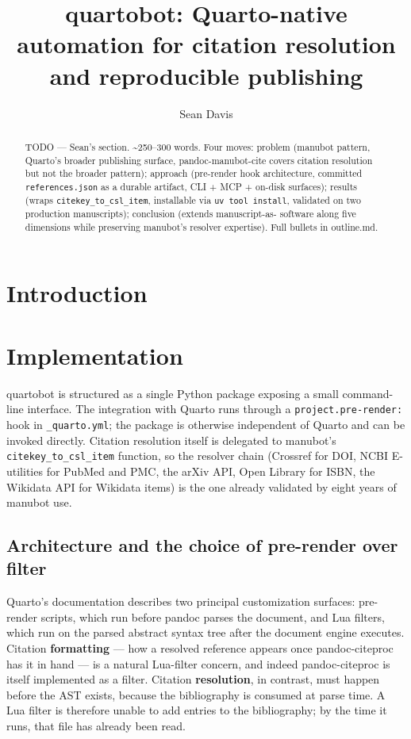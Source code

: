 \documentclass[
  letterpaper,
  DIV=11,
  numbers=noendperiod]{scrartcl}
\title{quartobot: Quarto-native automation for citation resolution and
reproducible publishing}
\author{Sean Davis}
\date{}
\begin{document}
\maketitle
\begin{abstract}
TODO --- Sean's section. \textasciitilde250--300 words. Four moves:
problem (manubot pattern, Quarto's broader publishing surface,
pandoc-manubot-cite covers citation resolution but not the broader
pattern); approach (pre-render hook architecture, committed
\texttt{references.json} as a durable artifact, CLI + MCP + on-disk
surfaces); results (wraps \texttt{citekey\_to\_csl\_item}, installable
via \texttt{uv\ tool\ install}, validated on two production
manuscripts); conclusion (extends manuscript-as- software along five
dimensions while preserving manubot's resolver expertise). Full bullets
in outline.md.
\end{abstract}


\section{Introduction}\label{introduction}

\section{Implementation}\label{implementation}

quartobot is structured as a single Python package exposing a small
command-line interface. The integration with Quarto runs through a
\texttt{project.pre-render:} hook in \texttt{\_quarto.yml}; the package
is otherwise independent of Quarto and can be invoked directly. Citation
resolution itself is delegated to manubot's
\texttt{citekey\_to\_csl\_item} function, so the resolver chain
(Crossref for DOI, NCBI E-utilities for PubMed and PMC, the arXiv API,
Open Library for ISBN, the Wikidata API for Wikidata items) is the one
already validated by eight years of manubot use.

\subsection{Architecture and the choice of pre-render over
filter}\label{architecture-and-the-choice-of-pre-render-over-filter}

Quarto's documentation describes two principal customization surfaces:
pre-render scripts, which run before pandoc parses the document, and Lua
filters, which run on the parsed abstract syntax tree after the document
engine executes. Citation \textbf{formatting} --- how a resolved
reference appears once pandoc-citeproc has it in hand --- is a natural
Lua-filter concern, and indeed pandoc-citeproc is itself implemented as
a filter. Citation \textbf{resolution}, in contrast, must happen before
the AST exists, because the bibliography is consumed at parse time. A
Lua filter is therefore unable to add entries to the bibliography; by
the time it runs, that file has already been read.
\end{document}
